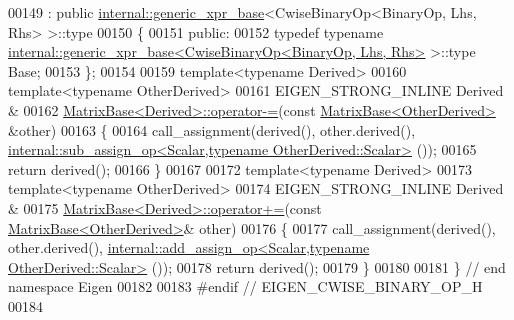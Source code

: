 \begin{DoxyCode}
00149   : \textcolor{keyword}{public} \hyperlink{struct_eigen_1_1internal_1_1generic__xpr__base}{internal::generic\_xpr\_base}<CwiseBinaryOp<BinaryOp, Lhs, Rhs> >::type
00150 \{
00151 \textcolor{keyword}{public}:
00152   \textcolor{keyword}{typedef} \textcolor{keyword}{typename} \hyperlink{struct_eigen_1_1internal_1_1generic__xpr__base}{internal::generic\_xpr\_base<CwiseBinaryOp<BinaryOp, Lhs, Rhs>}
       >::type Base;
00153 \};
00154 
00159 \textcolor{keyword}{template}<\textcolor{keyword}{typename} Derived>
00160 \textcolor{keyword}{template}<\textcolor{keyword}{typename} OtherDerived>
00161 EIGEN\_STRONG\_INLINE Derived &
00162 \hyperlink{group___core___module_class_eigen_1_1_matrix_base}{MatrixBase<Derived>::operator-=}(\textcolor{keyword}{const} 
      \hyperlink{group___core___module_class_eigen_1_1_matrix_base}{MatrixBase<OtherDerived>} &other)
00163 \{
00164   call\_assignment(derived(), other.derived(), 
      \hyperlink{struct_eigen_1_1internal_1_1sub__assign__op}{internal::sub\_assign\_op<Scalar,typename OtherDerived::Scalar>}
      ());
00165   \textcolor{keywordflow}{return} derived();
00166 \}
00167 
00172 \textcolor{keyword}{template}<\textcolor{keyword}{typename} Derived>
00173 \textcolor{keyword}{template}<\textcolor{keyword}{typename} OtherDerived>
00174 EIGEN\_STRONG\_INLINE Derived &
00175 \hyperlink{group___core___module_class_eigen_1_1_matrix_base}{MatrixBase<Derived>::operator+=}(\textcolor{keyword}{const} 
      \hyperlink{group___core___module_class_eigen_1_1_matrix_base}{MatrixBase<OtherDerived>}& other)
00176 \{
00177   call\_assignment(derived(), other.derived(), 
      \hyperlink{struct_eigen_1_1internal_1_1add__assign__op}{internal::add\_assign\_op<Scalar,typename OtherDerived::Scalar>}
      ());
00178   \textcolor{keywordflow}{return} derived();
00179 \}
00180 
00181 \} \textcolor{comment}{// end namespace Eigen}
00182 
00183 \textcolor{preprocessor}{#endif // EIGEN\_CWISE\_BINARY\_OP\_H}
00184 
\end{DoxyCode}
